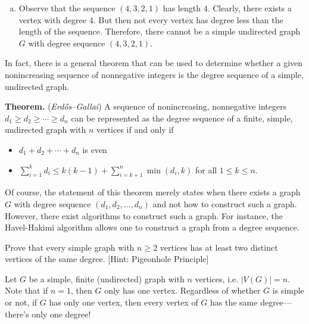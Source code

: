 \documentclass[11pt,letterpaper]{article}
\begin{document}
\begin{enumerate}[(a)]
\[\begin{tikzpicture}[scale=1.3]
	\path[line width=0.03cm] (a) edge node[below] {} (e);
	\path[line width=0.03cm] (b) edge node[below] {} (e);
	\path[line width=0.03cm] (c) edge node[below] {} (e);
	\path[line width=0.03cm] (d) edge node[below] {} (e);
	\end{tikzpicture}
	\] \pspace

\item Observe that the sequence $(4, 3, 2, 1)$ has length $4$. Clearly, there exists a vertex with degree $4$. But then not every vertex has degree less than the length of the sequence. Therefore, there cannot be a simple undirected graph $G$ with degree sequence $(4, 3, 2, 1)$. 
\end{enumerate} \pspace

In fact, there is a general theorem that can be used to determine whether a given nonincreasing sequence of nonnegative integers is the degree sequence of a simple, undirected graph. \pspace

{\bfseries Theorem.} ({\itshape Erd\H{o}s--Gallai}) A sequence of nonincreasing, nonnegative integers $d_1 \geq d_2 \geq \cdots \geq d_n$ can be represented as the degree sequence of a finite, simple, undirected graph with $n$ vertices if and only if 
	\begin{itemize}
	\item $d_1 + d_2 + \cdots + d_n$ is even
	\item $\displaystyle \sum_{i=1}^k d_i \leq k(k - 1) + \sum_{i=k+1}^n \min(d_i, k)$ for all $1 \leq k \leq n$.
	\end{itemize}

Of course, the statement of this theorem merely states when there exists a graph $G$ with degree sequence $(d_1, d_2, \ldots, d_n)$ and not how to construct such a graph. However, there exist algorithms to construct such a graph. For instance, the Havel-Hakimi algorithm allows one to construct a graph from a degree sequence. 



\newpage



 Prove that every simple graph with $n \geq 2$ vertices has at least two distinct vertices of the same degree. [Hint: Pigeonhole Principle] \pspace

\sol Let $G$ be a simple, finite (undirected) graph with $n$ vertices, i.e. $|V(G)|= n$. Note that if $n= 1$, then $G$ only has one vertex. Regardless of whether $G$ is simple or not, if $G$ has only one vertex, then every vertex of $G$ has the same degree---there's only one degree! \pspace
\end{document}
